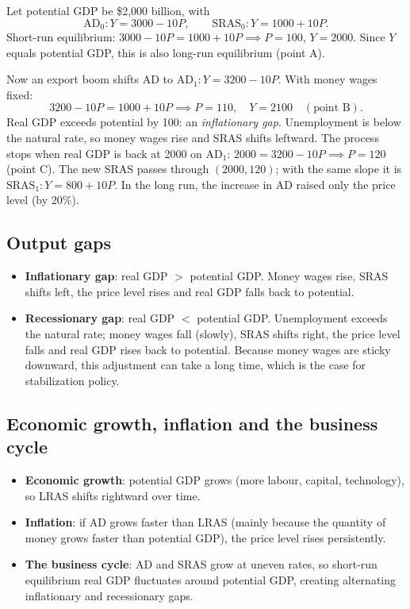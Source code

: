 \begin{example}
Let potential GDP be \$2{,}000 billion, with
\[
  \text{AD}_0: Y = 3000 - 10P, \qquad \text{SRAS}_0: Y = 1000 + 10P.
\]
Short-run equilibrium: $3000 - 10P = 1000 + 10P \implies P = 100$, $Y = 2000$. Since
$Y$ equals potential GDP, this is also long-run equilibrium (point A).

Now an export boom shifts AD to $\text{AD}_1: Y = 3200 - 10P$. With money wages fixed:
\[
  3200 - 10P = 1000 + 10P \implies P = 110, \quad Y = 2100 \quad (\text{point B}).
\]
Real GDP exceeds potential by 100: an \emph{inflationary gap}. Unemployment is below the
natural rate, so money wages rise and SRAS shifts leftward. The process stops when real
GDP is back at 2000 on AD$_1$: $2000 = 3200 - 10P \implies P = 120$ (point C). The new
SRAS passes through $(2000, 120)$; with the same slope it is
$\text{SRAS}_1: Y = 800 + 10P$. In the long run, the increase in AD raised only the price
level (by 20\%).
\end{example}

\subsection{Output gaps}

\begin{itemize}
  \item \textbf{Inflationary gap}: real GDP $>$ potential GDP. Money wages rise, SRAS
        shifts left, the price level rises and real GDP falls back to potential.
  \item \textbf{Recessionary gap}: real GDP $<$ potential GDP. Unemployment exceeds the
        natural rate; money wages fall (slowly), SRAS shifts right, the price level falls
        and real GDP rises back to potential. Because money wages are sticky downward, this
        adjustment can take a long time, which is the case for stabilization policy.
\end{itemize}

\subsection{Economic growth, inflation and the business cycle}

\begin{itemize}
  \item \textbf{Economic growth}: potential GDP grows (more labour, capital, technology), so
        LRAS shifts rightward over time.
  \item \textbf{Inflation}: if AD grows faster than LRAS (mainly because the quantity of
        money grows faster than potential GDP), the price level rises persistently.
  \item \textbf{The business cycle}: AD and SRAS grow at uneven rates, so short-run
        equilibrium real GDP fluctuates around potential GDP, creating alternating
        inflationary and recessionary gaps.
\end{itemize}

